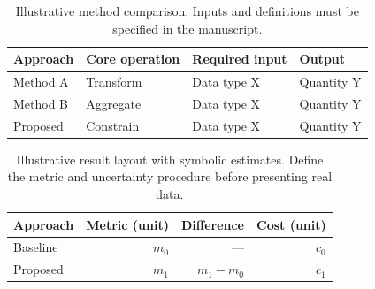 \begin{table}[t]
  \centering
  \caption{Illustrative method comparison. Inputs and definitions must be specified in the manuscript.}
  \label{tab:example-method-comparison}
  \small
  \setlength{\tabcolsep}{4pt}
  \begin{tabular}{@{}llll@{}}
    \toprule
    Approach & Core operation & Required input & Output \\
    \midrule
    Method A & Transform & Data type X & Quantity Y \\
    Method B & Aggregate & Data type X & Quantity Y \\
    Proposed & Constrain & Data type X & Quantity Y \\
    \bottomrule
  \end{tabular}
\end{table}

\begin{table}[t]
  \centering
  \caption{Illustrative result layout with symbolic estimates. Define the metric and uncertainty procedure before presenting real data.}
  \label{tab:example-results}
  \small
  \begin{tabular}{@{}lrrr@{}}
    \toprule
    Approach & Metric (unit) & Difference & Cost (unit) \\
    \midrule
    Baseline & $m_{0}$ & --- & $c_{0}$ \\
    Proposed & $m_{1}$ & $m_{1}-m_{0}$ & $c_{1}$ \\
    \bottomrule
  \end{tabular}
\end{table}
